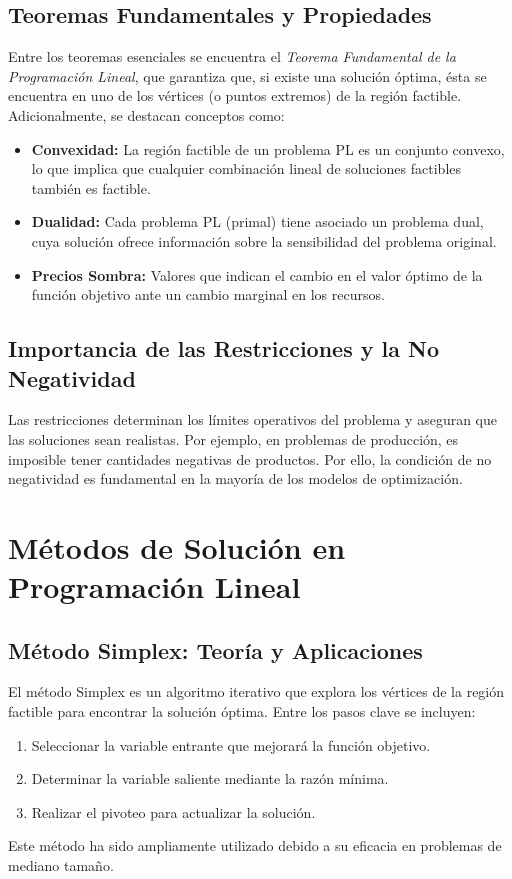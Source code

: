 	\subsection{Teoremas Fundamentales y Propiedades}
	Entre los teoremas esenciales se encuentra el \emph{Teorema Fundamental de la Programación Lineal}, que garantiza que, si existe una solución óptima, ésta se encuentra en uno de los vértices (o puntos extremos) de la región factible. Adicionalmente, se destacan conceptos como:
	\begin{itemize}
		\item \textbf{Convexidad:} La región factible de un problema PL es un conjunto convexo, lo que implica que cualquier combinación lineal de soluciones factibles también es factible.
		\item \textbf{Dualidad:} Cada problema PL (primal) tiene asociado un problema dual, cuya solución ofrece información sobre la sensibilidad del problema original.
		\item \textbf{Precios Sombra:} Valores que indican el cambio en el valor óptimo de la función objetivo ante un cambio marginal en los recursos.
	\end{itemize}
	
	\subsection{Importancia de las Restricciones y la No Negatividad}
	Las restricciones determinan los límites operativos del problema y aseguran que las soluciones sean realistas. Por ejemplo, en problemas de producción, es imposible tener cantidades negativas de productos. Por ello, la condición de no negatividad es fundamental en la mayoría de los modelos de optimización.
	\section{Métodos de Solución en Programación Lineal}
	
	\subsection{Método Simplex: Teoría y Aplicaciones}
	El método Simplex es un algoritmo iterativo que explora los vértices de la región factible para encontrar la solución óptima. Entre los pasos clave se incluyen:
	
	\begin{enumerate}
		\item Seleccionar la variable entrante que mejorará la función objetivo.
		\item Determinar la variable saliente mediante la razón mínima.
		\item Realizar el pivoteo para actualizar la solución.
	\end{enumerate}
	Este método ha sido ampliamente utilizado debido a su eficacia en problemas de mediano tamaño.
	
